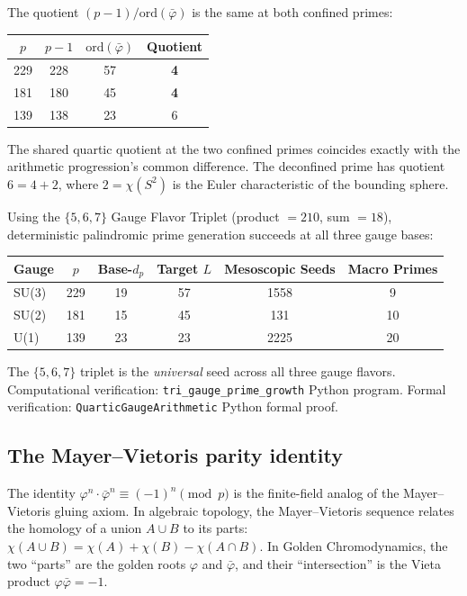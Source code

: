 \begin{result}
The quotient $(p - 1)/\mathrm{ord}(\bar\varphi)$ is the same at both confined primes:
\begin{center}
\begin{tabular}{@{}cccc@{}}
\toprule
$p$ & $p-1$ & $\mathrm{ord}(\bar\varphi)$ & Quotient \\
\midrule
229 & 228 & 57 & \textbf{4} \\
181 & 180 & 45 & \textbf{4} \\
139 & 138 & 23 & 6 \\
\bottomrule
\end{tabular}
\end{center}
The shared quartic quotient at the two confined primes coincides exactly with the arithmetic progression's common difference. The deconfined prime has quotient $6 = 4 + 2$, where $2 = \chi(S^2)$ is the Euler characteristic of the bounding sphere.
\end{result}

\begin{result}
\label{res:tri_gauge_primes}
Using the $\{5, 6, 7\}$ Gauge Flavor Triplet (product $= 210$, sum $= 18$), deterministic palindromic prime generation succeeds at all three gauge bases:
\begin{center}
\begin{tabular}{@{}lccccc@{}}
\toprule
Gauge & $p$ & Base-$d_p$ & Target $L$ & Mesoscopic Seeds & Macro Primes \\
\midrule
SU(3) & 229 & 19 & 57 & 1558 & 9 \\
SU(2) & 181 & 15 & 45 & 131 & 10 \\
U(1) & 139 & 23 & 23 & 2225 & 20 \\
\bottomrule
\end{tabular}
\end{center}
The $\{5, 6, 7\}$ triplet is the \emph{universal} seed across all three gauge flavors. Computational verification: \texttt{tri\_gauge\_prime\_growth} Python program. Formal verification: \texttt{QuarticGaugeArithmetic} Python formal proof.
\end{result}

\subsection{The Mayer--Vietoris parity identity}
\label{sec:mv_parity}

The identity $\varphi^n \cdot \bar\varphi^n \equiv (-1)^n \pmod{p}$
is the finite-field analog of the Mayer--Vietoris gluing axiom.
In algebraic topology, the Mayer--Vietoris sequence relates the
homology of a union $A \cup B$ to its parts:
$\chi(A \cup B) = \chi(A) + \chi(B) - \chi(A \cap B)$.
In Golden Chromodynamics, the two ``parts'' are the golden roots
$\varphi$ and $\bar\varphi$, and their ``intersection'' is the
Vieta product $\varphi \bar\varphi = -1$.

